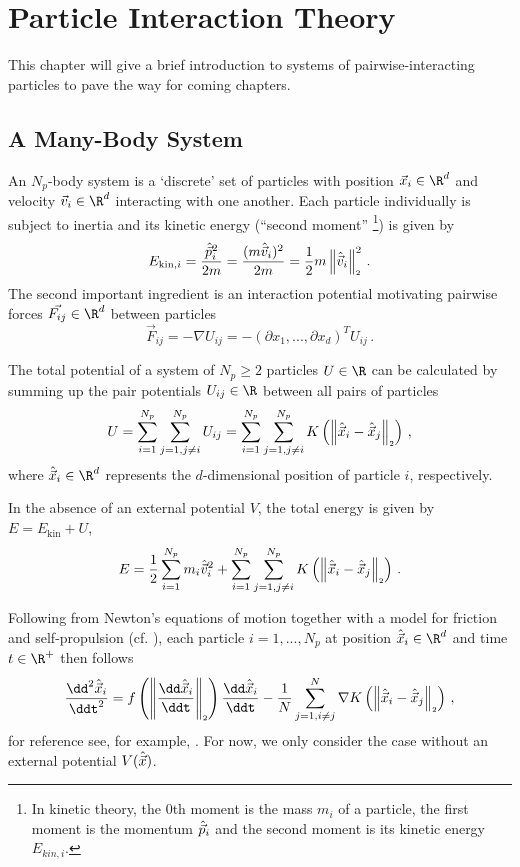 \chapter{Particle Interaction Theory}
\label{chap:particle-interaction-theory}

This chapter will give a brief introduction to systems of pairwise-interacting particles to pave the way for coming chapters.

\section{A Many-Body System}
An $N_p$-body system is a `discrete' set of particles with position $\vec{x}_i \in \R^d$ and velocity $\vec{v}_i \in \R^d$ interacting with one another.
Each particle individually is subject to inertia and its kinetic energy (``second moment'' \footnote{
  In kinetic theory, the $0$th moment is the mass $m_i$ of a particle, the first moment is the momentum $\hat{\vec{p}}_i$ and the second moment is its kinetic energy $E_{kin,i}$.
}) is given by
$$E_{\text{kin},i} = \frac{\hat{\vec{p}}_i^2}{2m} = \frac{(m \hat{\vec{v}}_i)^2}{2m} = \frac{1}{2} m \left\lVert\hat{\vec{v}}_i\right\rVert_{\scriptscriptstyle 2}^2\,.$$
The second important ingredient is an interaction potential motivating pairwise forces $\vec{F_{ij}} \in \R^d$ between particles
$$\vec{F}_{ij} = -\nabla U_{ij} = -\left(\partial x_1, ..., \partial x_d\right)^T U_{ij}\,.$$

The total potential of a system of $N_p \ge 2$ particles $U \in \R$ can be calculated by summing up the pair potentials $U_{ij} \in \R$ between all pairs of particles
$$U = \sum_{i=1}^{N_p}\sum_{j=1, j \neq i}^{N_p} U_{ij} = \sum_{i=1}^{N_p}\sum_{j=1, j \neq i}^{N_p} K\left(\left\lVert\hat{\vec{x}}_i - \hat{\vec{x}}_j\right\rVert_{\scriptscriptstyle 2}\right)\,,$$
where $\hatvec{x}_i \in \R^d$ represents the $d$-dimensional position of particle $i$, respectively.

In the absence of an external potential $V$, the total energy is given by $E = E_{\text{kin}} + U$,
\begin{equation}
  E = \frac{1}{2} \sum_{i=1}^{N_p} m_i \hat{\vec{v}}_i^2 + \sum_{i=1}^{N_p}\sum_{j=1, j \neq i}^{N_p} K\left(\left\lVert\hat{\vec{x}}_i - \hat{\vec{x}}_j\right\rVert_{\scriptscriptstyle 2}\right)\,.
  \label{eq:total-energy}
\end{equation}

Following from Newton's equations of motion together with a model for friction and self-propulsion (cf. ), each particle $i=1, ..., N_p$ at position $\hatvec{x}_i \in \R^d$ and time $t \in \R^+$ then follows
\begin{equation}
  \frac{\dd^2 \hatvec{x}_i}{\ddt^2} = f\left(\norm{\frac{\dd \hatvec{x}_i}{\ddt}}\right) \frac{\dd\hatvec{x}_i}{\ddt} - \frac{1}{N} \sum_{j=1, i\neq j}^{N} \nabla K\left(\norm{\hatvec{x}_i - \hatvec{x}_j}\right)\,,
  \label{eq:evolution-equation}
\end{equation}
for reference see, for example, \cite{2020-power-law-kernels, 2021-arbitrary-dimensions, 2017-explicit-solutions}.
For now, we only consider the case without an external potential $V(\hat{\vec{x}})$.


